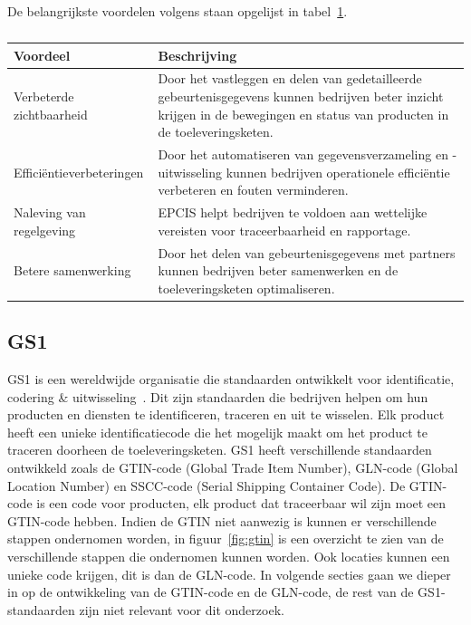 De belangrijkste voordelen volgens \textcite{GS12025} staan opgelijst in tabel~\ref{tab:epcis-voordelen}.
\begin{table}[H]
    \centering
     \begin{tabular}{lp{}}
          \toprule
          \textbf{Voordeel} & \textbf{Beschrijving} \\
          \toprule
          Verbeterde zichtbaarheid & Door het vastleggen en delen van gedetailleerde gebeurtenisgegevens kunnen bedrijven beter inzicht krijgen in de bewegingen en status van producten in de toeleveringsketen. \\
          \midrule
          Efficiëntieverbeteringen & Door het automatiseren van gegevensverzameling en -uitwisseling kunnen bedrijven operationele efficiëntie verbeteren en fouten verminderen. \\
          \midrule
          Naleving van regelgeving & EPCIS helpt bedrijven te voldoen aan wettelijke vereisten voor traceerbaarheid en rapportage. \\
          \midrule
          Betere samenwerking & Door het delen van gebeurtenisgegevens met partners kunnen bedrijven beter samenwerken en de toeleveringsketen optimaliseren. \\
          \bottomrule
     \end{tabular}
     \caption[Belangrijkste voordelen van EPCIS volgens GS1]{\label{tab:epcis-voordelen}}
\end{table}

\subsection{GS1}
GS1 is een wereldwijde organisatie die standaarden ontwikkelt voor identificatie, codering \& uitwisseling~\autocite{GS1standards}.
Dit zijn standaarden die bedrijven helpen om hun producten en diensten te identificeren, traceren en uit te wisselen.
Elk product heeft een unieke identificatiecode die het mogelijk maakt om het product te traceren doorheen de toeleveringsketen.
GS1 heeft verschillende standaarden ontwikkeld zoals de GTIN-code (Global Trade Item Number), GLN-code (Global Location Number) en SSCC-code (Serial Shipping Container Code).
De GTIN-code is een code voor producten, elk product dat traceerbaar wil zijn moet een GTIN-code hebben. 
Indien de GTIN niet aanwezig is kunnen er verschillende stappen ondernomen worden, in figuur~\ref{fig:gtin} is een overzicht te zien van de verschillende stappen die ondernomen kunnen worden.
Ook locaties kunnen een unieke code krijgen, dit is dan de GLN-code. In volgende secties gaan we dieper in op de ontwikkeling van de GTIN-code en de GLN-code, de rest van de GS1-standaarden zijn niet relevant voor dit onderzoek.


